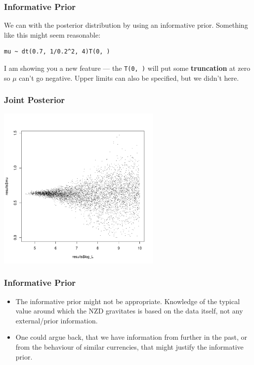 \documentclass{beamer}
\begin{document}
\begin{frame}[fragile]
\frametitle{Informative Prior}
We can  with the posterior distribution by using an
informative prior. Something like this might seem reasonable:
\begin{verbatim}
mu ~ dt(0.7, 1/0.2^2, 4)T(0, )
\end{verbatim}
\pause

I am showing you a new feature --- the \texttt{T(0, )} will put
some {\bf truncation} at zero so $\mu$ can't go negative. Upper limits can also
be specified, but we didn't here.
\end{frame}



\begin{frame}[fragile]
\frametitle{Joint Posterior}
\begin{center}
\includegraphics[width=0.6\textwidth]{images/nzd_posterior2.pdf}
\end{center}

\end{frame}

\begin{frame}[fragile]
\frametitle{Informative Prior}

\begin{itemize}
\item The informative prior might not be appropriate.
Knowledge of the typical value around which the
NZD gravitates is based on the data itself, not any external/prior information.\pause
\item One could argue back, that we have information from further in the past,
or from the behaviour of similar currencies,
that might justify the informative prior.
\end{itemize}


\end{frame}
\end{document}
